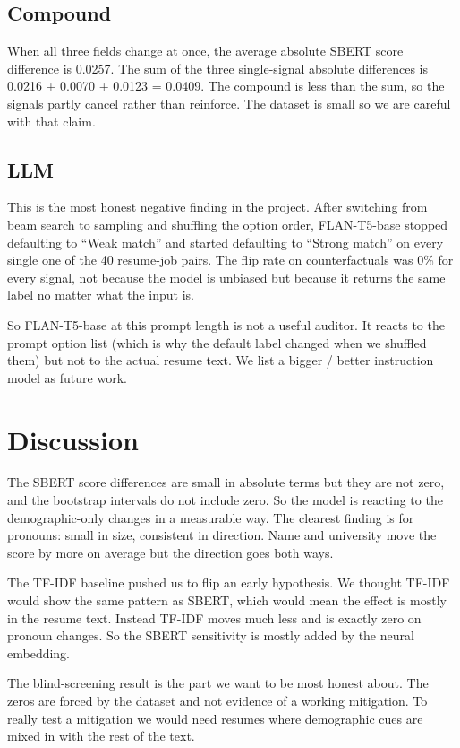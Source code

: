 \documentclass{article}
\begin{document}
\subsection{Compound}

When all three fields change at once, the average absolute SBERT score difference is 0.0257. The sum of the three single-signal absolute differences is 0.0216 + 0.0070 + 0.0123 = 0.0409. The compound is less than the sum, so the signals partly cancel rather than reinforce. The dataset is small so we are careful with that claim.

\subsection{LLM}

This is the most honest negative finding in the project. After switching from beam search to sampling and shuffling the option order, FLAN-T5-base stopped defaulting to ``Weak match'' and started defaulting to ``Strong match'' on every single one of the 40 resume-job pairs. The flip rate on counterfactuals was 0\% for every signal, not because the model is unbiased but because it returns the same label no matter what the input is.

So FLAN-T5-base at this prompt length is not a useful auditor. It reacts to the prompt option list (which is why the default label changed when we shuffled them) but not to the actual resume text. We list a bigger / better instruction model as future work.

\section{Discussion}
\label{sec:discussion}

The SBERT score differences are small in absolute terms but they are not zero, and the bootstrap intervals do not include zero. So the model is reacting to the demographic-only changes in a measurable way. The clearest finding is for pronouns: small in size, consistent in direction. Name and university move the score by more on average but the direction goes both ways.

The TF-IDF baseline pushed us to flip an early hypothesis. We thought TF-IDF would show the same pattern as SBERT, which would mean the effect is mostly in the resume text. Instead TF-IDF moves much less and is exactly zero on pronoun changes. So the SBERT sensitivity is mostly added by the neural embedding.

The blind-screening result is the part we want to be most honest about. The zeros are forced by the dataset and not evidence of a working mitigation. To really test a mitigation we would need resumes where demographic cues are mixed in with the rest of the text.
\end{document}
